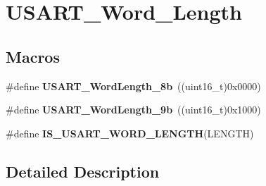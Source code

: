 \hypertarget{group___u_s_a_r_t___word___length}{\section{U\-S\-A\-R\-T\-\_\-\-Word\-\_\-\-Length}
\label{group___u_s_a_r_t___word___length}
}
\subsection*{Macros}
\begin{DoxyCompactItemize}
\item 
\hypertarget{group___u_s_a_r_t___word___length_ga08682faddc657df85a93627b5a146c25}{\#define {\bfseries U\-S\-A\-R\-T\-\_\-\-Word\-Length\-\_\-8b}~((uint16\-\_\-t)0x0000)}\label{group___u_s_a_r_t___word___length_ga08682faddc657df85a93627b5a146c25}

\item 
\hypertarget{group___u_s_a_r_t___word___length_gae7dd162142660e09e2321aa3f33dc4d2}{\#define {\bfseries U\-S\-A\-R\-T\-\_\-\-Word\-Length\-\_\-9b}~((uint16\-\_\-t)0x1000)}\label{group___u_s_a_r_t___word___length_gae7dd162142660e09e2321aa3f33dc4d2}

\item 
\#define {\bfseries I\-S\-\_\-\-U\-S\-A\-R\-T\-\_\-\-W\-O\-R\-D\-\_\-\-L\-E\-N\-G\-T\-H}(L\-E\-N\-G\-T\-H)
\end{DoxyCompactItemize}


\subsection{Detailed Description}


